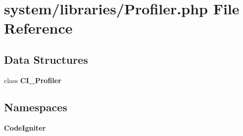 \section{system/libraries/\-Profiler.php File Reference}
\label{system_2libraries_2profiler_8php}
\subsection*{Data Structures}
\begin{DoxyCompactItemize}
\item 
class {\bf C\-I\-\_\-\-Profiler}
\end{DoxyCompactItemize}
\subsection*{Namespaces}
\begin{DoxyCompactItemize}
\item 
{\bf Code\-Igniter}
\end{DoxyCompactItemize}

